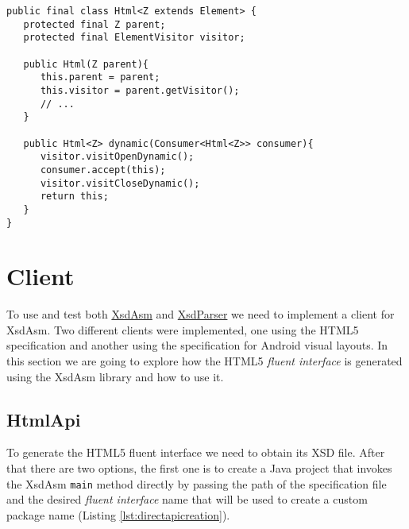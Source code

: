 \bigskip


\begin{minipage}{\linewidth}
\begin{lstlisting}[caption={Html Class - The Dynamic method},label={lst:htmldynamicmethod}]
public final class Html<Z extends Element> {
   protected final Z parent;
   protected final ElementVisitor visitor;
   
   public Html(Z parent){
      this.parent = parent;
      this.visitor = parent.getVisitor();
      // ...
   }
   
   public Html<Z> dynamic(Consumer<Html<Z>> consumer){
      visitor.visitOpenDynamic();
      consumer.accept(this);
      visitor.visitCloseDynamic();
      return this;
   }   
}
\end{lstlisting}
\end{minipage}

\newpage

\section{Client} %
\label{sec:client}

To use and test both \hyperref[sec:xsdasm]{XsdAsm} and \hyperref[sec:xsdparser]{XsdParser} we need to implement a client for XsdAsm. Two different clients were implemented, one using the \ac{HTML}5 specification and another using the specification for Android visual layouts. In this section we are going to explore how the \ac{HTML}5 \textit{fluent interface} is generated using the XsdAsm library and how to use it.

\subsection{HtmlApi}

To generate the \ac{HTML}5 fluent interface we need to obtain its \ac{XSD} file. After that there are two options, the first one is to create a Java project that invokes the XsdAsm \texttt{main} method directly by passing the path of the specification file and the desired \textit{fluent interface} name that will be used to create a custom package name (Listing \ref{lst:directapicreation}).

\bigskip


